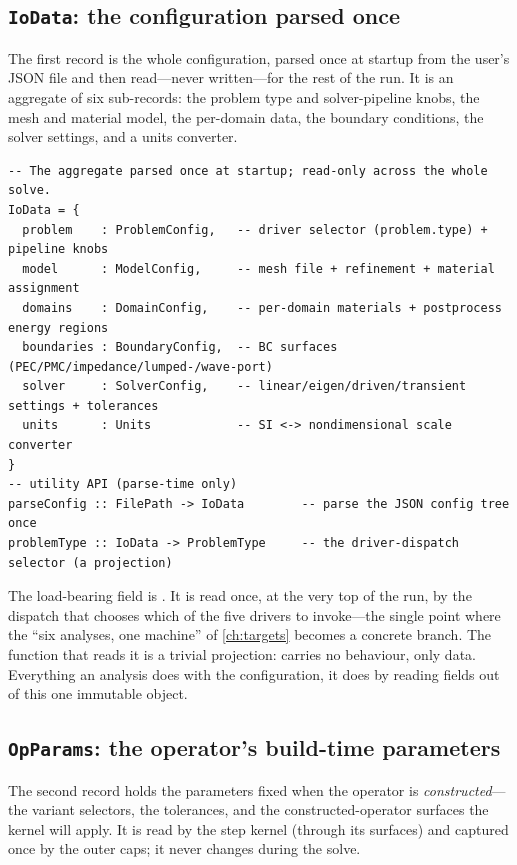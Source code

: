 \subsection{\texttt{IoData}: the configuration parsed once}

The first record is the whole configuration, parsed once at startup from the
user's JSON file and then read---never written---for the rest of the run. It is an
aggregate of six sub-records: the problem type and solver-pipeline knobs, the mesh
and material model, the per-domain data, the boundary conditions, the solver
settings, and a units converter.

\begin{lstlisting}[style=l4style]
-- The aggregate parsed once at startup; read-only across the whole solve.
IoData = {
  problem    : ProblemConfig,   -- driver selector (problem.type) + pipeline knobs
  model      : ModelConfig,     -- mesh file + refinement + material assignment
  domains    : DomainConfig,    -- per-domain materials + postprocess energy regions
  boundaries : BoundaryConfig,  -- BC surfaces (PEC/PMC/impedance/lumped-/wave-port)
  solver     : SolverConfig,    -- linear/eigen/driven/transient settings + tolerances
  units      : Units            -- SI <-> nondimensional scale converter
}
-- utility API (parse-time only)
parseConfig :: FilePath -> IoData        -- parse the JSON config tree once
problemType :: IoData -> ProblemType     -- the driver-dispatch selector (a projection)
\end{lstlisting}
The load-bearing field is . It is read once, at the very top of
the run, by the dispatch that chooses which of the five drivers to invoke---the
single point where the ``six analyses, one machine'' of \cref{ch:targets} becomes
a concrete branch. The function  that reads it is a trivial
projection:  carries no behaviour, only data. Everything an analysis
does with the configuration, it does by reading fields out of this one immutable
object.

\subsection{\texttt{OpParams}: the operator's build-time parameters}

The second record holds the parameters fixed when the operator is
\emph{constructed}---the variant selectors, the tolerances, and the
constructed-operator surfaces the kernel will apply. It is read by the step kernel
(through its surfaces) and captured once by the outer caps; it never changes during
the solve.

